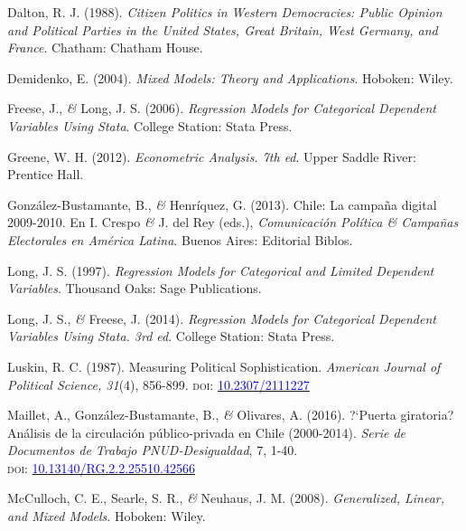 \documentclass[a4paper]{tufte-handout}
\begin{document}
{{{{{{{{{{{{{\begin{list}{}
\item{\small Dalton, R. J. (1988). {\itshape Citizen Politics in Western Democracies: Public Opinion and Political Parties in the United States, Great Britain, West Germany, and France}. Chatham: Chatham House.}

\item{\small Demidenko, E. (2004). {\itshape Mixed Models: Theory and Applications}. Hoboken: Wiley.}

\item{\small Freese, J., {\itshape \&} Long, J. S. (2006). {\itshape Regression Models for Categorical Dependent Variables Using Stata}. College Station: Stata Press.}

\item{\small Greene, W. H. (2012). {\itshape Econometric Analysis. 7th ed}. Upper Saddle River: Prentice Hall.}

\item{\small González-Bustamante, B., {\itshape \&} Henríquez, G. (2013). Chile: La campaña digital 2009-2010. En I. Crespo {\itshape \&} J. del Rey (eds.), {\itshape Comunicación Política \& Campañas Electorales en América Latina}. Buenos Aires: Editorial Biblos.}

\item{\small Long, J. S. (1997). {\itshape Regression Models for Categorical and Limited Dependent Variables}. Thousand Oaks: Sage Publications.}

\item{\small Long, J. S., {\itshape \&} Freese, J. (2014). {\itshape Regression Models for Categorical Dependent Variables Using Stata. 3rd ed}. College Station: Stata Press.}

\item{\small Luskin, R. C. (1987). Measuring Political Sophistication. {\itshape American Journal of Political Science, 31}(4), 856-899. {\scshape doi:} \href{http://doi.org/10.2307/2111227}{\textcolor{blue}{10.2307/2111227}}}

\item{\small Maillet, A., Gonz\'alez-Bustamante, B., {\itshape \&} Olivares, A. (2016). ?`Puerta giratoria? An\'alisis de la circulaci\'on p\'ublico-privada en Chile (2000-2014). {\itshape Serie de Documentos de Trabajo PNUD-Desigualdad}, 7,  1-40. \\ {\scshape doi:} \href{https://doi.org/10.13140/RG.2.2.25510.42566}{\textcolor{blue}{10.13140/RG.2.2.25510.42566}}}

\item{\small McCulloch, C. E., Searle, S. R., {\itshape \&} Neuhaus, J. M. (2008). {\itshape Generalized, Linear, and Mixed Models}. Hoboken: Wiley.}


\end{list}}}}}}}}}}}}}}
\end{document}
